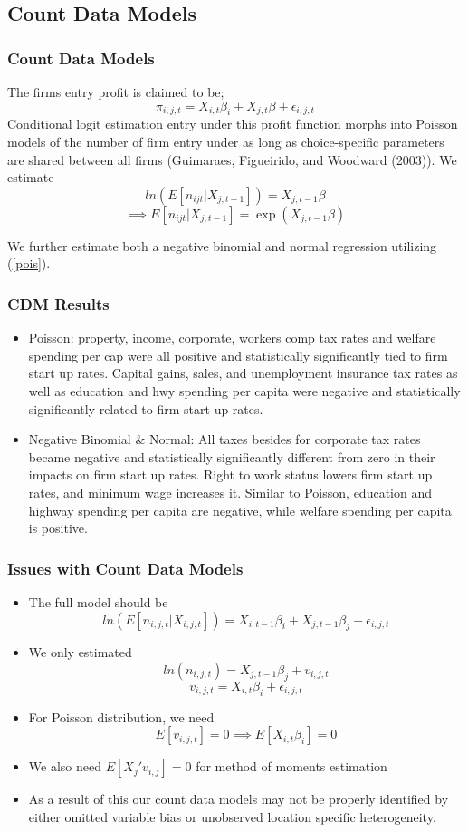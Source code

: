 \documentclass{beamer}
\begin{document}
\begin{frame}
\subsection{Count Data Models}
\frametitle{Count Data Models}
The firms entry profit is claimed to be;
$$\pi_{i,j,t} = X_{i,t}\beta_{i}+X_{j,t}\beta+\epsilon_{i,j,t}$$
Conditional logit estimation entry under this profit function morphs into Poisson models of the number of firm entry under as long as choice-specific parameters are shared between all firms (Guimaraes, Figueirido, and Woodward (2003)). We estimate
\begin{equation} \label{pois}
ln(E[n_{ijt}|X_{j,t-1}]) = X_{j,t-1}\beta
\end{equation}
$$\implies E[n_{ijt}|X_{j,t-1}] = \exp(X_{j,t-1}\beta)$$

We further estimate both a negative binomial and normal regression utilizing (\ref{pois}).
\end{frame}

\begin{frame}
\frametitle{CDM Results}
\begin{itemize}
\item Poisson: property, income, corporate, workers comp tax rates and welfare spending per cap were all positive and statistically significantly tied to firm start up rates. Capital gains, sales, and unemployment insurance tax rates as well as education and hwy spending per capita were negative and statistically significantly related to firm start up rates.
\item Negative Binomial \& Normal: All taxes besides for corporate tax rates became negative and statistically significantly different from zero in their impacts on firm start up rates. Right to work status lowers firm start up rates, and minimum wage increases it. Similar to Poisson, education and highway spending per capita are negative, while welfare spending per capita is positive.
\end{itemize}
\end{frame}

\begin{frame}
\frametitle{Issues with Count Data Models}
\begin{itemize}
\item The full model should be
\begin{equation}
ln(E[n_{i,j,t}|X_{i,j,t}]) = X_{i,t-1}\beta_{i}+X_{j,t-1}\beta_{j}+\epsilon_{i,j,t}
\end{equation}
\item We only estimated
$$ln(n_{i,j,t}) = X_{j,t-1}\beta_{j}+v_{i,j,t}$$
$$v_{i,j,t} = X_{i,t}\beta_{i}+\epsilon_{i,j,t}$$
\item For Poisson distribution, we need
$$E[v_{i,j,t}] = 0 \implies E[X_{i,t}\beta_{i}] = 0$$
\item We also need $E[X_{j}'v_{i,j}] = 0$ for method of moments estimation
\item As a result of this our count data models may not be properly identified by either omitted variable bias or unobserved location specific heterogeneity.
\end{itemize}
\end{frame}
\end{document}
